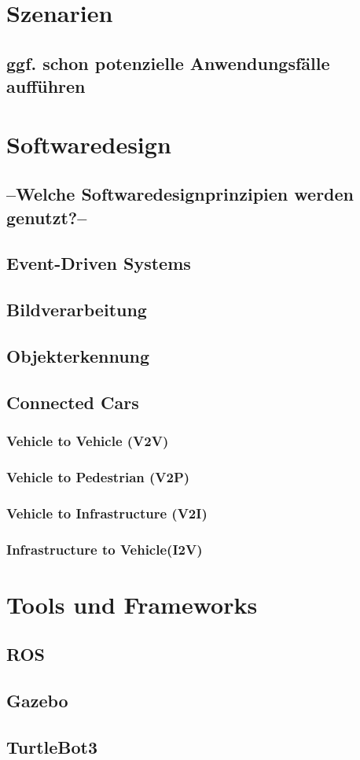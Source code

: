 \section{Szenarien}
\subsection{ggf. schon potenzielle Anwendungsfälle aufführen}

\section{Softwaredesign}
\subsection{--Welche Softwaredesignprinzipien werden genutzt?--}
\subsection{Event-Driven Systems}
\subsection{Bildverarbeitung}
\subsection{Objekterkennung}
\subsection{Connected Cars}
\subsubsection{Vehicle to Vehicle (V2V)}
\subsubsection{Vehicle to Pedestrian (V2P)}
\subsubsection{Vehicle to Infrastructure (V2I)}
\subsubsection{Infrastructure to Vehicle(I2V)}

\section{Tools und Frameworks}
\subsection{ROS}
\subsection{Gazebo}
\subsection{TurtleBot3}